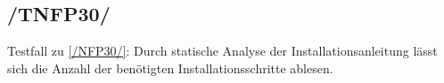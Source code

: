 \subsection*{/TNFP30/}

\label{/TNFP30/} Testfall zu \ref{/NFP30/}: Durch \gls{statische Analyse} der Installationsanleitung lässt sich die Anzahl der benötigten Installationsschritte ablesen.